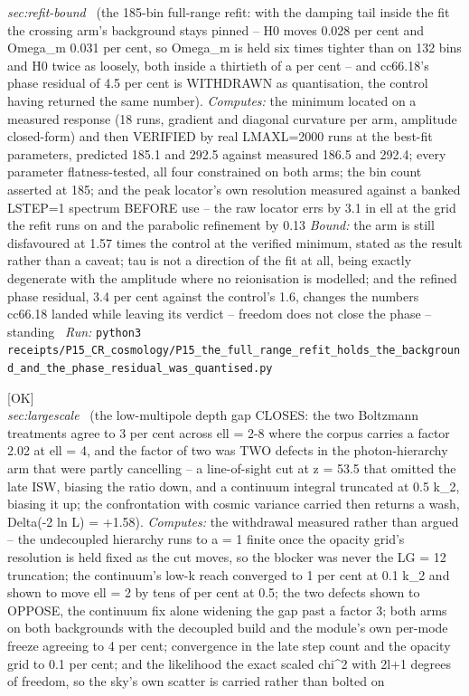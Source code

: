 \begin{description}
\textit{sec:refit-bound} \ (the 185-bin full-range refit: with the damping tail inside the fit the crossing arm's background stays pinned -- H0 moves 0.028 per cent and Omega\_m 0.031 per cent, so Omega\_m is held six times tighter than on 132 bins and H0 twice as loosely, both inside a thirtieth of a per cent -- and cc66.18's phase residual of 4.5 per cent is WITHDRAWN as quantisation, the control having returned the same number). 
\emph{Computes:} the minimum located on a measured response (18 runs, gradient and diagonal curvature per arm, amplitude closed-form) and then VERIFIED by real LMAXL=2000 runs at the best-fit parameters, predicted 185.1 and 292.5 against measured 186.5 and 292.4; every parameter flatness-tested, all four constrained on both arms; the bin count asserted at 185; and the peak locator's own resolution measured against a banked LSTEP=1 spectrum BEFORE use -- the raw locator errs by 3.1 in ell at the grid the refit runs on and the parabolic refinement by 0.13
 \emph{Bound:} the arm is still disfavoured at 1.57 times the control at the verified minimum, stated as the result rather than a caveat; tau is not a direction of the fit at all, being exactly degenerate with the amplitude where no reionisation is modelled; and the refined phase residual, 3.4 per cent against the control's 1.6, changes the numbers cc66.18 landed while leaving its verdict -- freedom does not close the phase -- standing
\ \emph{Run:} \texttt{python3 receipts/P15\_CR\_cosmology/P15\_the\_full\_range\_refit\_holds\_the\_background\_and\_the\_phase\_residual\_was\_quantised.py}
\item[\rcptlabel{P15_the_low_multipole_depth_gap_closes_and_two_defects_were_cancelling}{P15R171}\textbf{P15R171}\quad\texttt{P15\_the\_low\_multipole\_depth\_gap\_closes\_and\_two\_defects\_were\_cancelling}]\hfill\textsf{[OK]}\\
\textit{sec:largescale} \ (the low-multipole depth gap CLOSES: the two Boltzmann treatments agree to 3 per cent across ell = 2-8 where the corpus carries a factor 2.02 at ell = 4, and the factor of two was TWO defects in the photon-hierarchy arm that were partly cancelling -- a line-of-sight cut at z = 53.5 that omitted the late ISW, biasing the ratio down, and a continuum integral truncated at 0.5 k\_2, biasing it up; the confrontation with cosmic variance carried then returns a wash, Delta(-2 ln L) = +1.58). 
\emph{Computes:} the withdrawal measured rather than argued -- the undecoupled hierarchy runs to a = 1 finite once the opacity grid's resolution is held fixed as the cut moves, so the blocker was never the LG = 12 truncation; the continuum's low-k reach converged to 1 per cent at 0.1 k\_2 and shown to move ell = 2 by tens of per cent at 0.5; the two defects shown to OPPOSE, the continuum fix alone widening the gap past a factor 3; both arms on both backgrounds with the decoupled build and the module's own per-mode freeze agreeing to 4 per cent; convergence in the late step count and the opacity grid to 0.1 per cent; and the likelihood the exact scaled chi\textasciicircum{}2 with 2l+1 degrees of freedom, so the sky's own scatter is carried rather than bolted on

\end{description}

